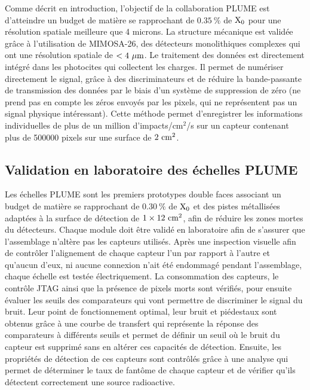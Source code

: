     Comme décrit en introduction, l'objectif de la collaboration PLUME est d'atteindre un budget de matière se rapprochant de $0.35~\%$ de $\rm{X_0}$ pour une résolution spatiale meilleure que 4 microns.
  La structure mécanique est validée grâce à l'utilisation de MIMOSA-26, des détecteurs monolithiques complexes qui ont une résolution spatiale de $< 4~\mu\rm{m}$.
  Le traitement des données est directement intégré dans les photocites qui collectent les charges. 
  Il permet de numériser directement le signal, grâce à des discriminateurs et de réduire la bande-passante de transmission des données par le biais d'un système de suppression de zéro (ne prend pas en compte les zéros envoyés par les pixels, qui ne représentent pas un signal physique intéressant).
  Cette méthode permet d'enregistrer les informations individuelles de plus de un million d'impacts/cm$^2$/s sur un capteur contenant plus de 500000 pixels sur une surface de $2~\rm{cm}^2$.
  
   \subsection{Validation en laboratoire des échelles PLUME}

  Les échelles PLUME sont les premiers prototypes double faces associant un budget de matière se rapprochant de $0.30~\%$ de $\rm{X_0}$ et des pistes métallisées adaptées à la surface de détection de $1 \times 12~\rm{cm}^2$, afin de réduire les zones mortes du détecteurs. 
  Chaque module doit être validé en laboratoire afin de s'assurer que l'assemblage n'altère pas les capteurs utilisés.
  Après une inspection visuelle afin de contrôler l'alignement de chaque capteur l'un par rapport à l'autre et qu'aucun d'eux, ni aucune connexion n'ait été endommagé pendant l'assemblage, chaque échelle est testée électriquement.
  La consommation des capteurs, le contrôle JTAG ainsi que la présence de pixels morts sont vérifiés, pour ensuite évaluer les seuils des comparateurs qui vont permettre de discriminer le signal du bruit.
  Leur point de fonctionnement optimal, leur bruit et piédestaux sont obtenus grâce à une courbe de transfert qui représente la réponse des comparateurs à différents seuils et permet de définir un seuil où le bruit du capteur est supprimé sans en altérer ces capacités de détection.
  Ensuite, les propriétés de détection de ces capteurs sont contrôlés grâce à une analyse qui permet de déterminer le taux de fantôme de chaque capteur et de vérifier qu'ils détectent correctement une source radioactive.
  
